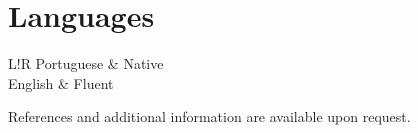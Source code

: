 \documentclass[10pt]{article}
\newcommand\VRule{\color{lightgray}\vrule width 0.5pt}
\begin{document}
\section*{Languages}
\begin{tabular}{L!{\VRule}R}
Portuguese & Native\\
English & Fluent\\
\end{tabular}

{\vspace{20pt}
\vspace{20pt}
\scriptsize\hfill References and additional information are available upon request.}
\end{document}
